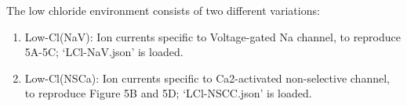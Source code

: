 \documentclass[fleqn,10pt]{physiome}
\begin{document}
The low chloride environment consists of two different variations:
\begin{enumerate}
\item Low-Cl(NaV): Ion currents specific to Voltage-gated Na channel, to reproduce 5A-5C; `LCl-NaV.json' is loaded.
\item Low-Cl(NSCa): Ion currents specific to Ca2-activated non-selective channel, to reproduce  Figure 5B and 5D; `LCl-NSCC.json' is loaded.
\end{enumerate}

\begin{table}[ht!]
\caption{Parameters are categorized according to each different variation. There are six different variations. These parameters are collected from \cite[Tables 2A and 2B]{lees2014computational}, and some from the appendix of the primary paper.}\label{tab:variations}
\centering
{}
\end{table}
\end{document}
